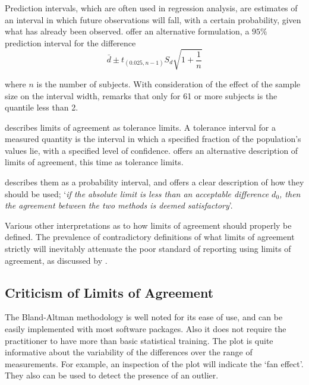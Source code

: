 \documentclass[12pt, a4paper]{report}
\theoremstyle{plain}
\theoremstyle{definition}
\theoremstyle{remark}
\begin{document}
	Prediction intervals, which are often used in regression analysis, are estimates of an interval in which future
	observations will fall, with a certain probability, given what has already been observed. \citet{BXC2008} offer an alternative
	formulation, a $95\%$ prediction interval for the difference
	\begin{equation}
	\bar{d} \pm t_{(0.025, n-1)}S_{d} \sqrt{1+\frac{1}{n}}
	\end{equation}
	
	where $n$ is the number of subjects. With consideration of the effect of the sample size on the interval
	width, \citet{BXC2008} remarks that only for 61 or more subjects is the quantile less than 2.
	
	\citet{luiz} describes limits of agreement as tolerance limits. A
	tolerance interval for a measured quantity is the interval in
	which a specified fraction of the population's values lie, with a
	specified level of confidence. \citet{luiz} offers an alternative description of limits of agreement, this time as tolerance limits. 
	
	\citet{Barnhart} describes them as a probability interval, and offers a clear description of how they should be used; `\textit{if the absolute limit is less than an acceptable difference $d_{0}$, then the agreement between the two methods is deemed satisfactory}'.
	
	Various other interpretations as to how limits of agreement should properly be defined. The prevalence of contradictory definitions of what limits of agreement strictly will inevitably attenuate the poor standard of reporting using limits of agreement, as discussed by \citet{mantha}.
	
	
	
	\subsection{Criticism of Limits of Agreement }
	The Bland-Altman methodology is well noted for its ease of use, and can be easily implemented with most software packages. Also it does not require the practitioner to have more than basic statistical training. The plot is quite informative about the variability of the differences over the range of measurements. For
	example, an inspection of the plot will indicate the `fan effect'. They also can be used to detect the presence of an outlier.
	
\end{document}
